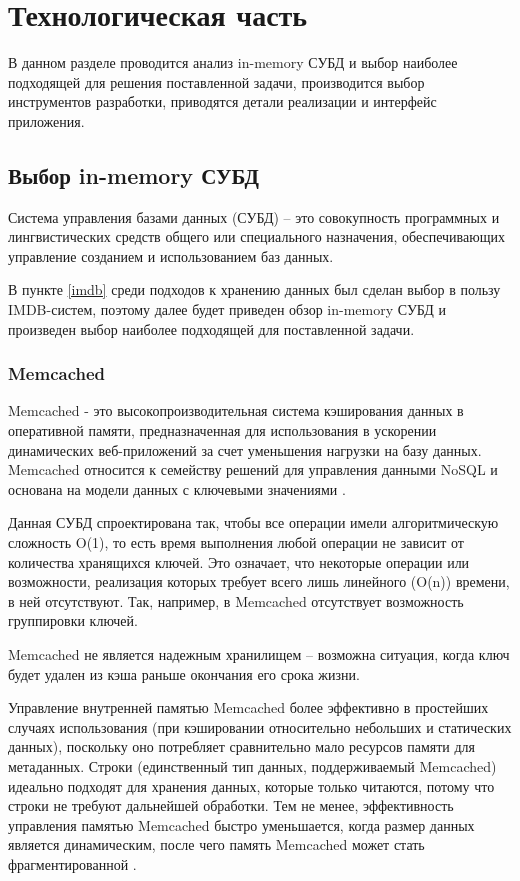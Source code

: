 \chapter{Технологическая часть}

В данном разделе проводится анализ in-memory СУБД и выбор наиболее подходящей для решения поставленной задачи, производится выбор инструментов разработки, приводятся детали реализации и интерфейс приложения.

\section{Выбор in-memory СУБД}


Система управления базами данных (СУБД) -- это совокупность программных и лингвистических средств общего или специального назначения, обеспечивающих управление созданием и использованием баз данных\cite{database}.

В пункте \ref{imdb} среди подходов к хранению данных был сделан выбор в пользу IMDB-систем, поэтому далее будет приведен обзор in-memory СУБД и произведен выбор наиболее подходящей для поставленной задачи.




\subsection{Memcached}

Memcached - это высокопроизводительная система кэширования данных в оперативной памяти, предназначенная для использования в ускорении динамических веб-приложений за счет уменьшения нагрузки на базу данных. Memcached относится к семейству решений для управления данными NoSQL и основана на модели данных с ключевыми значениями  \cite{memcash}. 

Данная СУБД спроектирована так, чтобы все операции имели алгоритмическую сложность O(1), то есть время выполнения любой операции не зависит от количества хранящихся ключей. Это означает, что некоторые операции или возможности, реализация которых требует всего лишь линейного (O(n)) времени, в ней отсутствуют. Так, например, в Memcached отсутствует возможность группировки ключей.


Memcached не является надежным хранилищем – возможна ситуация, когда ключ будет удален из кэша раньше окончания его срока жизни. 

Управление внутренней памятью Memcached более эффективно в простейших случаях использования (при кэшировании относительно небольших и статических данных), поскольку оно потребляет сравнительно мало ресурсов памяти для метаданных. Строки (единственный тип данных, поддерживаемый Memcached) идеально подходят для хранения данных, которые только читаются, потому что строки не требуют дальнейшей обработки. Тем не менее, эффективность управления памятью Memcached быстро уменьшается, когда размер данных является динамическим, после чего память Memcached может стать фрагментированной \cite{memcash2}. 

